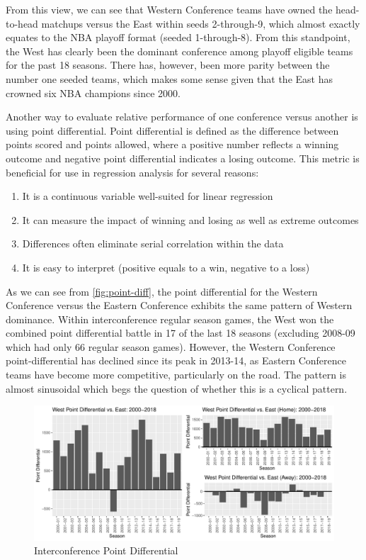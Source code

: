 \documentclass[
    12pt,
    a4paper,
    titlepage,  %
    abstract,  %
    headings=standardclasses,  %
    bibliography=totocnumbered  %
]{scrartcl}
\begin{document}
From this view, we can see that Western Conference teams have owned the head-to-head matchups versus the East within seeds 2-through-9, which almost exactly equates to the NBA playoff format (seeded 1-through-8). From this standpoint, the West has clearly been the dominant conference among playoff eligible teams for the past 18 seasons. There has, however, been more parity between the number one seeded teams, which makes some sense given that the East has crowned six NBA champions since 2000.

Another way to evaluate relative performance of one conference versus another is using point differential. Point differential is defined as the difference between points scored and points allowed, where a positive number reflects a winning outcome and negative point differential indicates a losing outcome. This metric is beneficial for use in regression analysis for several reasons:

\begin{enumerate}
    \item It is a continuous variable well-suited for linear regression
    \item It can measure the impact of winning and losing as well as extreme outcomes
    \item Differences often eliminate serial correlation within the data
    \item It is easy to interpret (positive equals to a win, negative to a loss)
\end{enumerate}

As we can see from \autoref{fig:point-diff}, the point differential for the Western Conference versus the Eastern Conference exhibits the same pattern of Western dominance. Within interconference regular season games, the West won the combined point differential battle in 17 of the last 18 seasons (excluding 2008-09 which had only 66 regular season games). However, the Western Conference point-differential has declined since its peak in 2013-14, as Eastern Conference teams have become more competitive, particularly on the road. The pattern is almost sinusoidal which begs the question of whether this is a cyclical pattern.

\begin{figure}[ht]
    \centering
    \includegraphics[width=\linewidth]{point-diff}
    \caption{Interconference Point Differential}
    \label{fig:point-diff}
\end{figure}
\end{document}
